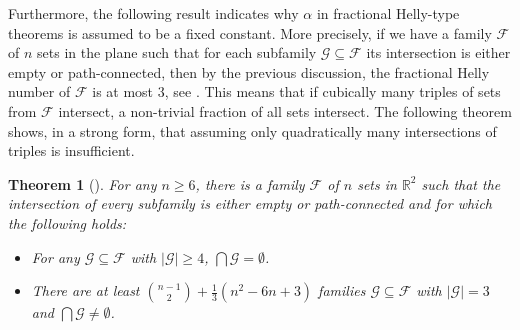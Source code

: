 \documentclass[a4paper,12pt]{amsart}
\newcommand{\R}{\mathbb{R}} 	%
\newcommand{\F}{\mathcal{F}} 	%
\newtheorem{theorem}{Theorem}
\theoremstyle{definition}
\begin{document}
Furthermore, the following result indicates why $\alpha$ in  fractional Helly-type theorems is assumed to be a fixed constant.
More precisely, if we have a family $\F$ of $n$ sets in the plane such that for each subfamily $\mathcal G\subseteq\F$ its intersection is either empty or path-connected, then by the previous discussion, the fractional Helly number of $\F$ is at most $3$, see \cite{goaoc2024intersectionpatternsspacesforbidden}.
This means that if cubically many triples of sets from $\F$ intersect, a non-trivial fraction of all sets intersect.
The following theorem shows, in a strong form, that assuming only quadratically many intersections of triples is insufficient.
\begin{theorem}[\cite{KalPat}]
For any $n\geq 6$, there is a family $\F$ of $n$ sets in $\R^2$ such that the intersection of every subfamily is either empty or path-connected and for which the following holds:
\begin{itemize}
\item For any $\mathcal G\subseteq \F$ with $|\mathcal G|\geq 4$, $\bigcap \mathcal G=\emptyset$.
\item There are at least $\binom{n-1}{2}+\frac{1}{3}\left( n^2-6n+3\right)$ families $\mathcal G \subseteq \F$
with $|\mathcal G|=3$ and $\bigcap\mathcal G\neq \emptyset$.
\end{itemize}
\end{theorem}
\end{document}
